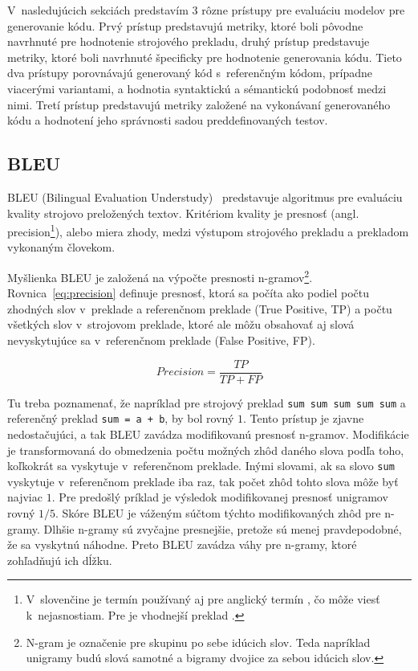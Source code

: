 V~nasledujúcich sekciách predstavím 3 rôzne prístupy pre evaluáciu modelov pre generovanie kódu. Prvý prístup predstavujú metriky, ktoré boli pôvodne navrhnuté pre hodnotenie strojového prekladu, druhý prístup predstavuje metriky, ktoré boli navrhnuté špecificky pre hodnotenie generovania kódu. Tieto dva prístupy porovnávajú generovaný kód s~referenčným kódom, prípadne viacerými variantami, a hodnotia syntaktickú a sémantickú podobnosť medzi nimi. Tretí prístup predstavujú metriky založené na vykonávaní generovaného kódu a hodnotení jeho správnosti sadou preddefinovaných testov.

\subsection{BLEU}
BLEU (Bilingual Evaluation Understudy)~\cite{papinenibleu2002} predstavuje algoritmus pre evaluáciu kvality strojovo preložených textov. Kritériom kvality je presnosť (angl. precision\footnote{V~slovenčine je termín  používaný aj pre anglický termín , čo môže viesť k~nejasnostiam. Pre  je vhodnejší preklad .}), alebo miera zhody, medzi výstupom strojového prekladu a prekladom vykonaným človekom.

Myšlienka BLEU je založená na výpočte presnosti n-gramov\footnote{N-gram je označenie pre skupinu po sebe idúcich slov. Teda napríklad unigramy budú slová samotné a bigramy dvojice za sebou idúcich slov.}. Rovnica~\ref{eq:precision} definuje presnosť, ktorá sa počíta ako podiel počtu zhodných slov v~preklade a referenčnom preklade (True Positive, TP) a počtu všetkých slov v~strojovom preklade, ktoré ale môžu obsahovať aj slová nevyskytujúce sa v~referenčnom preklade (False Positive, FP).

\begin{equation}\label{eq:precision}
Precision = \frac{TP}{TP+FP}
\end{equation}

Tu treba poznamenať, že napríklad pre strojový preklad \texttt{sum sum sum sum sum} a referenčný preklad \texttt{sum = a + b}, by bol rovný $1$. Tento prístup je zjavne nedostačujúci, a tak BLEU zavádza modifikovanú presnosť n-gramov. Modifikácie je transformovaná do obmedzenia počtu možných zhôd daného slova podľa toho, koľkokrát sa vyskytuje v~referenčnom preklade. Inými slovami, ak sa slovo \texttt{sum} vyskytuje v~referenčnom preklade iba raz, tak počet zhôd tohto slova môže byť najviac $1$. Pre predošlý príklad je výsledok modifikovanej presnosť unigramov rovný $1/5$. Skóre BLEU je váženým súčtom týchto modifikovaných zhôd pre n-gramy. Dlhšie n-gramy sú zvyčajne presnejšie, pretože sú menej pravdepodobné, že sa vyskytnú náhodne. Preto BLEU zavádza váhy pre n-gramy, ktoré zohľadňujú ich dĺžku.

